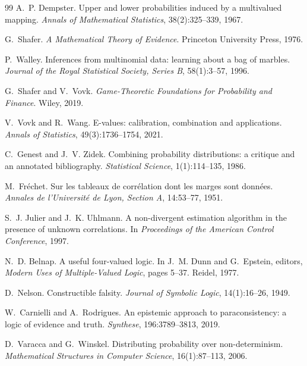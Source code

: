 \documentclass[11pt]{article}
\theoremstyle{definition}
\theoremstyle{remark}
\begin{document}
\begin{thebibliography}{99}
A.~P. Dempster.
\newblock Upper and lower probabilities induced by a multivalued mapping.
\newblock \emph{Annals of Mathematical Statistics}, 38(2):325--339, 1967.

G.~Shafer.
\newblock \emph{A Mathematical Theory of Evidence}.
\newblock Princeton University Press, 1976.

P.~Walley.
\newblock Inferences from multinomial data: learning about a bag of marbles.
\newblock \emph{Journal of the Royal Statistical Society, Series B},
  58(1):3--57, 1996.

G.~Shafer and V.~Vovk.
\newblock \emph{Game-Theoretic Foundations for Probability and Finance}.
\newblock Wiley, 2019.

V.~Vovk and R.~Wang.
\newblock E-values: calibration, combination and applications.
\newblock \emph{Annals of Statistics}, 49(3):1736--1754, 2021.

C.~Genest and J.~V. Zidek.
\newblock Combining probability distributions: a critique and an annotated
  bibliography.
\newblock \emph{Statistical Science}, 1(1):114--135, 1986.

M.~Fr\'echet.
\newblock Sur les tableaux de corr\'elation dont les marges sont donn\'ees.
\newblock \emph{Annales de l'Universit\'e de Lyon, Section A}, 14:53--77, 1951.

S.~J. Julier and J.~K. Uhlmann.
\newblock A non-divergent estimation algorithm in the presence of unknown
  correlations.
\newblock In \emph{Proceedings of the American Control Conference}, 1997.

N.~D. Belnap.
\newblock A useful four-valued logic.
\newblock In J.~M. Dunn and G.~Epstein, editors, \emph{Modern Uses of
  Multiple-Valued Logic}, pages 5--37. Reidel, 1977.

D.~Nelson.
\newblock Constructible falsity.
\newblock \emph{Journal of Symbolic Logic}, 14(1):16--26, 1949.

W.~Carnielli and A.~Rodrigues.
\newblock An epistemic approach to paraconsistency: a logic of evidence and
  truth.
\newblock \emph{Synthese}, 196:3789--3813, 2019.

D.~Varacca and G.~Winskel.
\newblock Distributing probability over non-determinism.
\newblock \emph{Mathematical Structures in Computer Science}, 16(1):87--113,
  2006.


\end{thebibliography}
\end{document}
